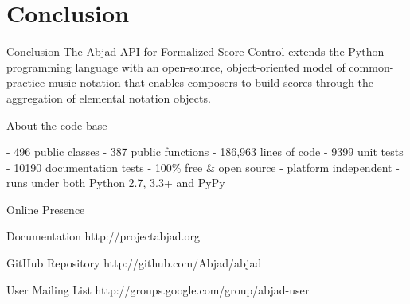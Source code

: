 \section{Conclusion}

\begin{frame}{Conclusion}
The Abjad API for Formalized Score Control extends the Python programming
language with an open-source, object-oriented model of common-practice music
notation that enables composers to build scores through the aggregation of
elemental notation objects.
\end{frame}

\begin{frame}[fragile]{About the code base}
\begin{markdown}
- 496 public classes
- 387 public functions
- 186,963 lines of code
- 9399 unit tests
- 10190 documentation tests
- 100\% free \& open source
- platform independent
- runs under both Python 2.7, 3.3+ and PyPy
\end{markdown}
\end{frame}

\begin{frame}{Online Presence}
    \begin{block}{Documentation}
        http://projectabjad.org
    \end{block}
    \begin{block}{GitHub Repository}
        http://github.com/Abjad/abjad
    \end{block}
    \begin{block}{User Mailing List}
        http://groups.google.com/group/abjad-user
    \end{block}
\end{frame}


